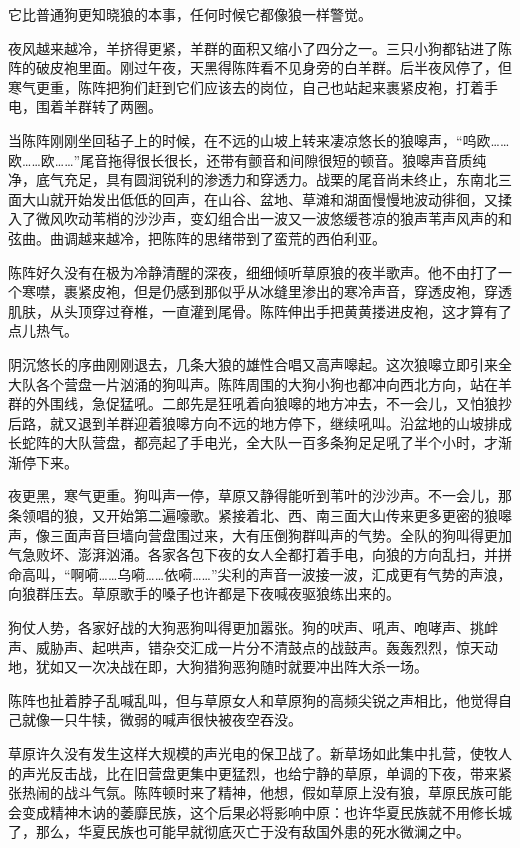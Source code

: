 \par 它比普通狗更知晓狼的本事，任何时候它都像狼一样警觉。
\par 夜风越来越冷，羊挤得更紧，羊群的面积又缩小了四分之一。三只小狗都钻进了陈阵的破皮袍里面。刚过午夜，天黑得陈阵看不见身旁的白羊群。后半夜风停了，但寒气更重，陈阵把狗们赶到它们应该去的岗位，自己也站起来裹紧皮袍，打着手电，围着羊群转了两圈。
\par 当陈阵刚刚坐回毡子上的时候，在不远的山坡上转来凄凉悠长的狼嗥声，“呜欧……欧……欧……”尾音拖得很长很长，还带有颤音和间隙很短的顿音。狼嗥声音质纯净，底气充足，具有圆润锐利的渗透力和穿透力。战栗的尾音尚未终止，东南北三面大山就开始发出低低的回声，在山谷、盆地、草滩和湖面慢慢地波动徘徊，又揉入了微风吹动苇梢的沙沙声，变幻组合出一波又一波悠缓苍凉的狼声苇声风声的和弦曲。曲调越来越冷，把陈阵的思绪带到了蛮荒的西伯利亚。
\par 陈阵好久没有在极为冷静清醒的深夜，细细倾听草原狼的夜半歌声。他不由打了一个寒噤，裹紧皮袍，但是仍感到那似乎从冰缝里渗出的寒冷声音，穿透皮袍，穿透肌肤，从头顶穿过脊椎，一直灌到尾骨。陈阵伸出手把黄黄搂进皮袍，这才算有了点儿热气。
\par 阴沉悠长的序曲刚刚退去，几条大狼的雄性合唱又高声嗥起。这次狼嗥立即引来全大队各个营盘一片汹涌的狗叫声。陈阵周围的大狗小狗也都冲向西北方向，站在羊群的外围线，急促猛吼。二郎先是狂吼着向狼嗥的地方冲去，不一会儿，又怕狼抄后路，就又退到羊群迎着狼嗥方向不远的地方停下，继续吼叫。沿盆地的山坡排成长蛇阵的大队营盘，都亮起了手电光，全大队一百多条狗足足吼了半个小时，才渐渐停下来。
\par 夜更黑，寒气更重。狗叫声一停，草原又静得能听到苇叶的沙沙声。不一会儿，那条领唱的狼，又开始第二遍嚎歌。紧接着北、西、南三面大山传来更多更密的狼嗥声，像三面声音巨墙向营盘围过来，大有压倒狗群叫声的气势。全队的狗叫得更加气急败坏、澎湃汹涌。各家各包下夜的女人全都打着手电，向狼的方向乱扫，并拼命高叫，“啊嗬……乌嗬……依嗬……”尖利的声音一波接一波，汇成更有气势的声浪，向狼群压去。草原歌手的嗓子也许都是下夜喊夜驱狼练出来的。
\par 狗仗人势，各家好战的大狗恶狗叫得更加嚣张。狗的吠声、吼声、咆哮声、挑衅声、威胁声、起哄声，错杂交汇成一片分不清鼓点的战鼓声。轰轰烈烈，惊天动地，犹如又一次决战在即，大狗猎狗恶狗随时就要冲出阵大杀一场。
\par 陈阵也扯着脖子乱喊乱叫，但与草原女人和草原狗的高频尖锐之声相比，他觉得自己就像一只牛犊，微弱的喊声很快被夜空吞没。
\par 草原许久没有发生这样大规模的声光电的保卫战了。新草场如此集中扎营，使牧人的声光反击战，比在旧营盘更集中更猛烈，也给宁静的草原，单调的下夜，带来紧张热闹的战斗气氛。陈阵顿时来了精神，他想，假如草原上没有狼，草原民族可能会变成精神木讷的萎靡民族，这个后果必将影响中原：也许华夏民族就不用修长城了，那么，华夏民族也可能早就彻底灭亡于没有敌国外患的死水微澜之中。
